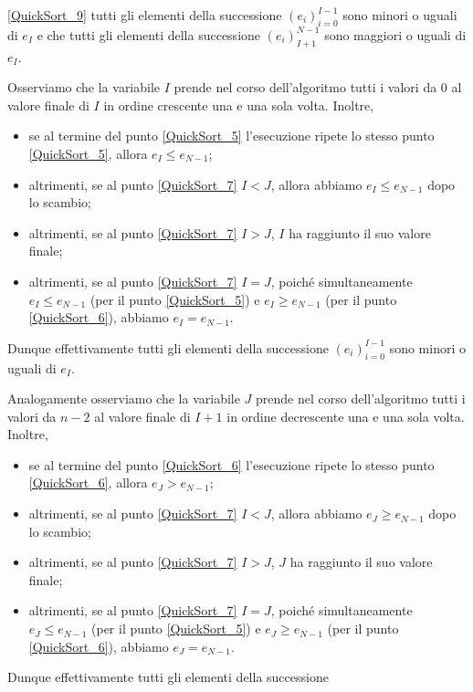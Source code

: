\ref{QuickSort_9} tutti gli elementi della successione
$(e_i)_{i = 0}^{I - 1}$
sono minori o uguali di $e_I$ e che tutti gli elementi della successione
$(e_i)_{I + 1}^{N - 1}$
sono maggiori o uguali di $e_I$.
\par Osserviamo che la variabile $I$ prende nel corso dell'algoritmo tutti i
valori da $0$ al valore finale di $I$ in ordine crescente una e una sola volta.
Inoltre,
\begin{itemize}
  \item se al termine del punto \ref{QuickSort_5} l'esecuzione ripete lo stesso
    punto \ref{QuickSort_5}, allora $e_I \leq e_{N - 1}$;
  \item altrimenti, se al punto \ref{QuickSort_7} $I < J$, allora abbiamo
    $e_I \leq e_{N - 1}$ dopo lo scambio;
  \item altrimenti, se al punto \ref{QuickSort_7} $I > J$, $I$ ha raggiunto il
    suo valore finale;
  \item altrimenti, se al punto \ref{QuickSort_7} $I = J$, poich\'e
    simultaneamente
    $e_I \leq e_{N - 1}$ (per il punto \ref{QuickSort_5}) e
    $e_I \geq e_{N - 1}$ (per il punto \ref{QuickSort_6}), abbiamo
    $e_I = e_{N - 1}$.
\end{itemize}
\par Dunque effettivamente  tutti gli elementi della successione
$(e_i)_{i = 0}^{I - 1}$
sono minori o uguali di $e_I$.
\par Analogamente osserviamo che la variabile $J$ prende nel corso
dell'algoritmo tutti i valori da $n - 2$ al valore finale di $I + 1$ in
ordine decrescente una e una sola volta. Inoltre,
\begin{itemize}
  \item se al termine del punto \ref{QuickSort_6} l'esecuzione ripete lo stesso
    punto \ref{QuickSort_6}, allora $e_J > e_{N - 1}$;
  \item altrimenti, se al punto \ref{QuickSort_7} $I < J$, allora abbiamo
    $e_J \geq e_{N - 1}$ dopo lo scambio;
  \item altrimenti, se al punto \ref{QuickSort_7} $I > J$, $J$ ha raggiunto il
    suo valore finale;
  \item altrimenti, se al punto \ref{QuickSort_7} $I = J$, poich\'e
    simultaneamente
    $e_J \leq e_{N - 1}$ (per il punto \ref{QuickSort_5}) e
    $e_J \geq e_{N - 1}$ (per il punto \ref{QuickSort_6}), abbiamo
    $e_J = e_{N - 1}$.
\end{itemize}
\par Dunque effettivamente  tutti gli elementi della successione
